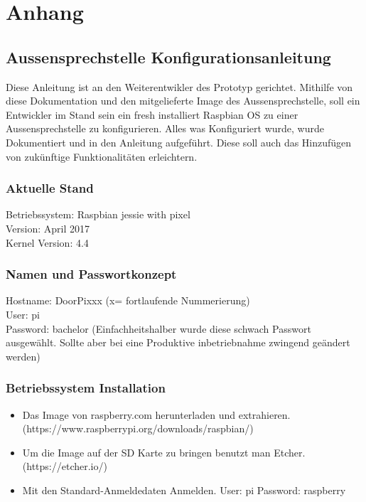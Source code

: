 \section{Anhang}
\label{sec:anhang}

\subsection{Aussensprechstelle Konfigurationsanleitung}
Diese Anleitung ist an den Weiterentwikler des Prototyp gerichtet. Mithilfe von diese Dokumentation und den mitgelieferte Image des Aussensprechstelle, soll ein Entwickler im Stand sein ein fresh installiert Raspbian OS zu einer Aussensprechstelle zu konfigurieren. Alles was Konfiguriert wurde, wurde Dokumentiert und in den Anleitung aufgeführt. Diese soll auch das Hinzufügen von zukünftige Funktionalitäten erleichtern. 

\subsubsection{Aktuelle Stand}
Betriebssystem:	Raspbian jessie with pixel\\
Version: April 2017\\
Kernel Version: 4.4

\subsubsection{Namen und Passwortkonzept}
Hostname: DoorPixxx (x= fortlaufende Nummerierung)\\
User: pi\\
Password: bachelor (Einfachheitshalber wurde diese schwach Passwort ausgewählt. Sollte aber bei eine Produktive inbetriebnahme zwingend geändert werden)\\

\subsubsection{Betriebssystem Installation}
\begin{itemize}
	\item Das Image von raspberry.com herunterladen und extrahieren. (https://www.raspberrypi.org/downloads/raspbian/)
	\item Um die Image auf der SD Karte zu bringen benutzt man Etcher. (https://etcher.io/)
	\item Mit den Standard-Anmeldedaten Anmelden. User: pi Password: raspberry
\end{itemize}



